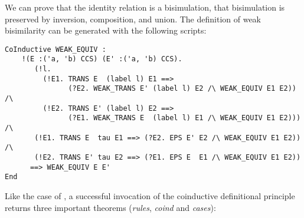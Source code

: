 We can prove that the identity relation is a bisimulation, that
bisimulation is preserved by inversion, composition, and union. 
The definition of weak bisimilarity can be generated with the
following scripts:
\begin{lstlisting}
CoInductive WEAK_EQUIV :
    !(E :('a, 'b) CCS) (E' :('a, 'b) CCS).
       (!l.
         (!E1. TRANS E  (label l) E1 ==>
               (?E2. WEAK_TRANS E' (label l) E2 /\ WEAK_EQUIV E1 E2)) /\
         (!E2. TRANS E' (label l) E2 ==>
               (?E1. WEAK_TRANS E  (label l) E1 /\ WEAK_EQUIV E1 E2))) /\
       (!E1. TRANS E  tau E1 ==> (?E2. EPS E' E2 /\ WEAK_EQUIV E1 E2)) /\
       (!E2. TRANS E' tau E2 ==> (?E1. EPS E  E1 /\ WEAK_EQUIV E1 E2))
      ==> WEAK_EQUIV E E'
End
\end{lstlisting}
Like the case of , a successful invocation of the coinductive definitional principle returns three
important theorems (\emph{rules}, \emph{coind} and \emph{cases}):
